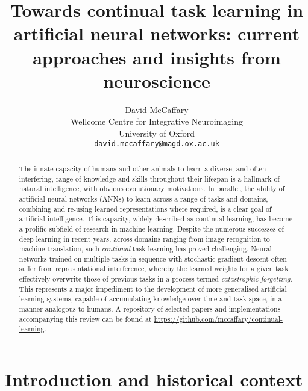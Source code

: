 \documentclass{article} %
\title{Towards continual task learning in artificial neural networks: current approaches and insights from neuroscience}
\author{{David McCaffary}
\\
Wellcome Centre for Integrative Neuroimaging\\
University of Oxford\\
\texttt{david.mccaffary@magd.ox.ac.uk} \\
}
\begin{document}
\maketitle

\begin{abstract}
The innate capacity of humans and other animals to learn a diverse, and often interfering, range of knowledge and skills throughout their lifespan is a hallmark of natural intelligence, with obvious evolutionary motivations. In parallel, the ability of artificial neural networks (ANNs) to learn across a range of tasks and domains, combining and re-using learned representations where required, is a clear goal of artificial intelligence. This capacity, widely described as continual learning, has become a prolific subfield of research in machine learning. Despite the numerous successes of deep learning in recent years, across domains ranging from image recognition to machine translation, such \textit{continual} task learning has proved challenging. Neural networks trained on multiple tasks in sequence with stochastic gradient descent often suffer from representational interference, whereby the learned weights for a given task effectively overwrite those of previous tasks in a process termed \textit{catastrophic forgetting}. This represents a major impediment to the development of more generalised artificial learning systems, capable of accumulating knowledge over time and task space, in a manner analogous to humans. A repository of selected papers and implementations accompanying this review can be found at \url{https://github.com/mccaffary/continual-learning}.
\end{abstract}

\section*{Introduction and historical context}
\end{document}
